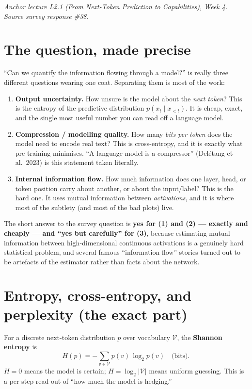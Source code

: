 \documentclass[11pt,letterpaper]{article}
\begin{document}

\noindent\textit{Anchor lecture L2.1 (From Next-Token Prediction to Capabilities), Week 4.
Source survey response \#38.}

\section{The question, made precise}

``Can we quantify the information flowing through a model?'' is really three
different questions wearing one coat. Separating them is most of the work:

\begin{enumerate}[noitemsep]
\item \textbf{Output uncertainty.} How unsure is the model about the \emph{next
  token}? This is the entropy of the predictive distribution $p(x_t \mid x_{<t})$.
  It is cheap, exact, and the single most useful number you can read off a
  language model.
\item \textbf{Compression / modelling quality.} How many \emph{bits per token}
  does the model need to encode real text? This is cross-entropy, and it is
  exactly what pre-training minimises. ``A language model is a compressor''
  (Del\'etang et al.\ 2023) is this statement taken literally.
\item \textbf{Internal information flow.} How much information does one layer, head,
  or token position carry about another, or about the input/label? This is the
  hard one. It uses mutual information between \emph{activations}, and it is where
  most of the subtlety (and most of the bad plots) live.
\end{enumerate}

The short answer to the survey question is \textbf{yes for (1) and (2) --- exactly
and cheaply --- and ``yes but carefully'' for (3)}, because estimating mutual
information between high-dimensional continuous activations is a genuinely hard
statistical problem, and several famous ``information flow'' stories turned out to
be artefacts of the estimator rather than facts about the network.

\section{Entropy, cross-entropy, and perplexity (the exact part)}

For a discrete next-token distribution $p$ over vocabulary $\mathcal V$, the
\textbf{Shannon entropy} \citep{shannon1948} is
\[
  H(p) = -\sum_{v \in \mathcal V} p(v)\,\log_2 p(v) \quad\text{(bits)}.
\]
$H=0$ means the model is certain; $H=\log_2|\mathcal V|$ means uniform guessing.
This is a per-step read-out of ``how much the model is hedging.''
\end{document}
